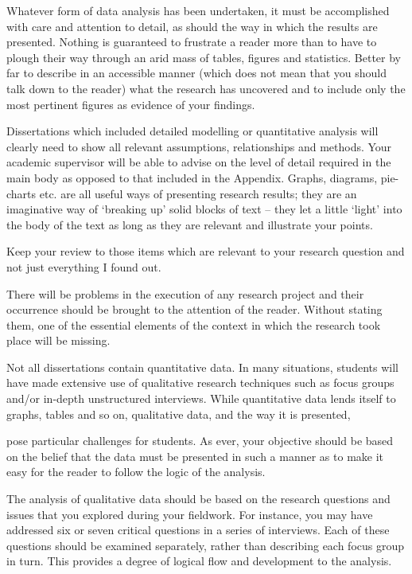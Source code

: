 			Whatever form of data analysis has been undertaken, it must be accomplished with care and attention to detail, as should the way in which the results are presented. Nothing is guaranteed to frustrate a reader more than to have to plough their way through an arid mass of tables, figures and statistics. Better by far to describe in an accessible manner (which does not mean that you should talk down to the reader) what the research has uncovered and to include only the most pertinent figures as evidence of your findings. 
			
			Dissertations which included detailed modelling or quantitative analysis will clearly need to show all relevant assumptions, relationships and methods. Your academic supervisor will be able to advise on the level of detail required in the main body as opposed to that included in the Appendix.
			Graphs, diagrams, pie-charts etc. are all useful ways of presenting research results; they are an imaginative way of ‘breaking up’ solid blocks of text – they let a little ‘light’ into the body of the text as long as they are relevant and illustrate your points.
			
			Keep your review to those items which are relevant to your research question and not just everything I found out.
			
			There will be problems in the execution of any research project and their occurrence should be brought to the attention of the reader. Without stating them, one of the essential elements of the context in which the research took place will be missing.
			
			Not all dissertations contain quantitative data. In many situations, students will have made extensive use of qualitative research techniques such as  focus groups and/or in-depth unstructured interviews. While quantitative data lends itself to graphs, tables and so on, qualitative data, and the way it is presented,
			
			pose particular challenges for students. As ever, your objective should be based on the belief that the data must be presented in such a manner as to make it easy for the reader to follow the logic of the analysis.
			
			The analysis of qualitative data should be based on the research questions and issues that you explored during your fieldwork. For instance, you may have addressed six or seven critical questions in a series of interviews. Each of these questions should be examined separately, rather than describing each focus group in turn. This provides a degree of logical flow and development to the analysis.
			

